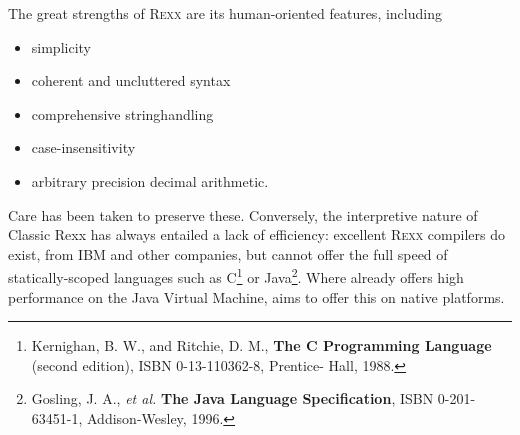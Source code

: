 The great strengths of R\textsc{exx} are its human-oriented features, including
\begin{itemize}
\item simplicity
\item coherent and uncluttered syntax
\item comprehensive stringhandling
\item case-insensitivity
\item arbitrary precision decimal arithmetic.
\end{itemize}
Care has been taken to preserve these. Conversely, the interpretive
nature of Classic Rexx has always entailed a lack of efficiency: excellent R\textsc{exx}
compilers do exist, from IBM and other companies, but cannot offer the
full speed of statically-scoped languages such as
C\footnote{Kernighan, B. W., and Ritchie, D. M., \textbf{The C
    Programming Language} (second edition), ISBN 0-13-110362-8,
  Prentice- Hall, 1988.} or Java\footnote{Gosling, J. A., \emph{et
    al.} \textbf{The Java Language Specification}, ISBN 0-201-63451-1,
  Addison-Wesley, 1996.}. Where \nr{} already offers high performance
on the Java Virtual Machine, \crexx{} aims to offer this on native platforms.



